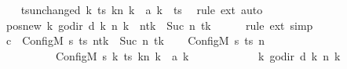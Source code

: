 \begin{isabellebody}
\ \ \isamarkupfalse%
\ ts{\isacharunderscore}{\kern0pt}unchanged{\isacharcolon}{\kern0pt}\ {\isachardoublequoteopen}{\isacharparenleft}{\kern0pt}{\isasymlambda}k{\isachardot}{\kern0pt}\ {\isacharparenleft}{\kern0pt}ts\ k{\isacharparenright}{\kern0pt}{\isacharparenleft}{\kern0pt}n\ k\ {\isacharcolon}{\kern0pt}{\isacharequal}{\kern0pt}\ {\isacharquery}{\kern0pt}a\ k{\isacharparenright}{\kern0pt}{\isacharparenright}{\kern0pt}\ {\isacharequal}{\kern0pt}\ ts{\isachardoublequoteclose}\ \isamarkupfalse%
\ {\isacharparenleft}{\kern0pt}rule\ ext{\isacharparenright}{\kern0pt}\ auto\isanewline
\ \ \isamarkupfalse%
\ pos{\isacharunderscore}{\kern0pt}new{\isacharcolon}{\kern0pt}\ {\isachardoublequoteopen}{\isacharparenleft}{\kern0pt}{\isasymlambda}k{\isachardot}{\kern0pt}\ go{\isacharunderscore}{\kern0pt}dir\ {\isacharparenleft}{\kern0pt}{\isacharquery}{\kern0pt}d\ k{\isacharparenright}{\kern0pt}\ {\isacharparenleft}{\kern0pt}n\ k{\isacharparenright}{\kern0pt}{\isacharparenright}{\kern0pt}\ {\isacharequal}{\kern0pt}\ n{\isacharparenleft}{\kern0pt}tk\ {\isacharcolon}{\kern0pt}{\isacharequal}{\kern0pt}\ Suc\ {\isacharparenleft}{\kern0pt}n\ tk{\isacharparenright}{\kern0pt}{\isacharparenright}{\kern0pt}{\isachardoublequoteclose}\isanewline
\ \ \ \ \isamarkupfalse%
\ {\isacharparenleft}{\kern0pt}rule\ ext{\isacharparenright}{\kern0pt}\ simp\isanewline
\ \ \isamarkupfalse%
\ {\isacharquery}{\kern0pt}c{\isacharprime}{\kern0pt}{\isacharprime}{\kern0pt}\ {\isacharequal}{\kern0pt}\ {\isachardoublequoteopen}Config\isactrlsub M\ {\isacharquery}{\kern0pt}s{\isacharprime}{\kern0pt}\ ts\ {\isacharparenleft}{\kern0pt}n{\isacharparenleft}{\kern0pt}tk\ {\isacharcolon}{\kern0pt}{\isacharequal}{\kern0pt}\ Suc\ {\isacharparenleft}{\kern0pt}n\ tk{\isacharparenright}{\kern0pt}{\isacharparenright}{\kern0pt}{\isacharparenright}{\kern0pt}{\isachardoublequoteclose}\isanewline
\ \ \isamarkupfalse%
\ {\isachardoublequoteopen}{\isacharparenleft}{\kern0pt}Config\isactrlsub M\ {\isacharquery}{\kern0pt}s\ ts\ n{\isacharcomma}{\kern0pt}\isanewline
\ \ \ \ \ \ \ \ \ \ Config\isactrlsub M\ {\isacharquery}{\kern0pt}s{\isacharprime}{\kern0pt}\ {\isacharparenleft}{\kern0pt}{\isasymlambda}k{\isachardot}{\kern0pt}\ {\isacharparenleft}{\kern0pt}ts\ k{\isacharparenright}{\kern0pt}{\isacharparenleft}{\kern0pt}n\ k\ {\isacharcolon}{\kern0pt}{\isacharequal}{\kern0pt}\ {\isacharquery}{\kern0pt}a\ k{\isacharparenright}{\kern0pt}{\isacharparenright}{\kern0pt}\isanewline
\ \ \ \ \ \ \ \ \ \ \ \ {\isacharparenleft}{\kern0pt}{\isasymlambda}k{\isachardot}{\kern0pt}\ go{\isacharunderscore}{\kern0pt}dir\ {\isacharparenleft}{\kern0pt}{\isacharquery}{\kern0pt}d\ k{\isacharparenright}{\kern0pt}\ {\isacharparenleft}{\kern0pt}n\ k{\isacharparenright}{\kern0pt}{\isacharparenright}{\kern0pt}{\isacharparenright}{\kern0pt}\isanewline

\end{isabellebody}
